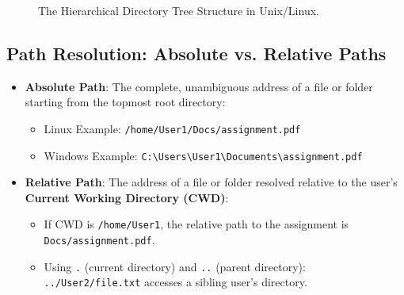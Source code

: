 \begin{figure}[htbp]
\centering
{}
\caption{The Hierarchical Directory Tree Structure in Unix/Linux.}
\label{fig:directory-tree-structure}
\end{figure}

\subsection{Path Resolution: Absolute vs. Relative Paths}
\begin{itemize}
    \item \textbf{Absolute Path}: The complete, unambiguous address of a file or folder starting from the topmost root directory:
    \begin{itemize}
        \item Linux Example: \texttt{/home/User1/Docs/assignment.pdf}
        \item Windows Example: \texttt{C:\textbackslash{}Users\textbackslash{}User1\textbackslash{}Documents\textbackslash{}assignment.pdf}
    \end{itemize}
    \item \textbf{Relative Path}: The address of a file or folder resolved relative to the user's \textbf{Current Working Directory (CWD)}:
    \begin{itemize}
        \item If CWD is \texttt{/home/User1}, the relative path to the assignment is \texttt{Docs/assignment.pdf}.
        \item Using \texttt{.} (current directory) and \texttt{..} (parent directory): \texttt{../User2/file.txt} accesses a sibling user's directory.
    \end{itemize}
\end{itemize}

